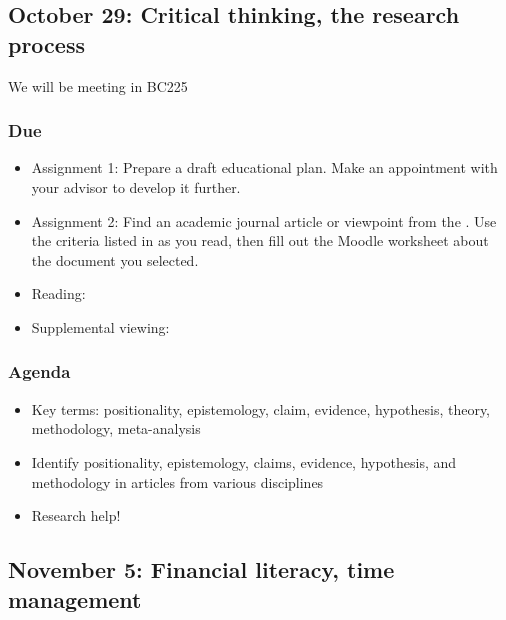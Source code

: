 \documentclass[12pt,article,oneside]{memoir}
\begin{document}
\subsection{October 29: Critical thinking, the research process}
We will be meeting in BC225
\subsubsection{Due}
\begin{itemize}
 \item Assignment 1: Prepare a draft educational plan.  Make an appointment with your advisor to develop it further.
 \item Assignment 2: Find an academic journal article or viewpoint from the .  Use the criteria listed in \cite{evaluation} as you read, then fill out the Moodle worksheet about the document you selected.
 \item Reading: \cite{evaluation}
 \item Supplemental viewing: \cite{gen-ed}
\end{itemize}


\subsubsection{Agenda}
\begin{itemize}
\item Key terms: positionality, epistemology, claim, evidence, hypothesis, theory, methodology, meta-analysis
\item Identify positionality, epistemology, claims, evidence, hypothesis, and methodology in articles from various disciplines
 \item Research help!
\end{itemize}




\subsection{November 5: Financial literacy, time management}
\end{document}
